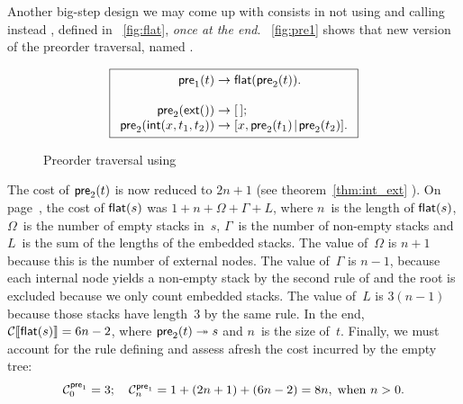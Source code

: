 Another big\hyp{}step design we may come
up with consists in not using  and
calling instead
, defined
in \fig~\vref{fig:flat}, \emph{once at the end}. \Fig~\vref{fig:pre1}
shows that new version of the preorder traversal, named
.
\begin{figure}
\begin{equation*}
\boxed{
\begin{array}{r@{\;}c@{\;}l}
\fun{pre}_1(t) & \rightarrow & \fun{flat}(\fun{pre}_2(t)).\\
\\
\fun{pre}_2(\fun{ext}()) & \rightarrow & \el;\\
\fun{pre}_2(\fun{int}(x,t_1,t_2)) & \rightarrow &
  \cons{x,\fun{pre}_2(t_1)}{\fun{pre}_2(t_2)}.
\end{array}}
\end{equation*}
\caption{Preorder traversal using }
\label{fig:pre1}
\end{figure}
The cost of \(\textsf{pre}_2(t)\) is now
reduced to \(2n+1\) (see theorem~\ref{thm:int_ext}
). On page~\pageref{cost:flat}, the cost of
\(\textsf{flat}(s)\) was \(1 + n + \Omega +
\Gamma + L\), where \(n\)~is the length of
\(\textsf{flat}(s)\), \(\Omega\)~is the number
of empty stacks in~\(s\), \(\Gamma\)~is the number of non\hyp{}empty
stacks and \(L\)~is the sum of the lengths of the embedded stacks. The
value of~\(\Omega\) is \(n+1\) because this is the number of external
nodes. The value of~\(\Gamma\) is \(n-1\), because each internal node
yields a non\hyp{}empty stack by the second rule of
 and the root is
excluded because we only count embedded stacks. The value of~\(L\) is
\(3(n-1)\) because those stacks have length~\(3\) by the same rule. In
the end, \(\mathcal{C}\llbracket{\textsf{flat}(s)}\rrbracket = 6n - 2\), where \(\textsf{pre}_2(t)
\twoheadrightarrow s\) and \(n\)~is the size of~\(t\). Finally, we
must account for the rule defining
 and assess afresh the
cost incurred by the empty tree:
\begin{equation*}
\C{\fun{pre}_1}{0} = 3;\index{pre1@$\C{\fun{pre}_1}{n}$}
\quad
\C{\fun{pre}_1}{n} = 1 + (2n+1) + (6n - 2) = 8n,\;
\text{when \(n > 0\).}
\end{equation*}

